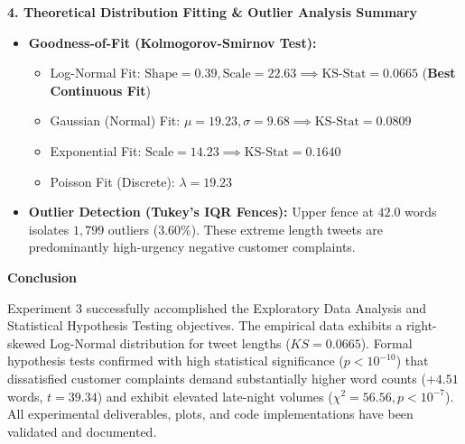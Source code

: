 \documentclass[12pt]{article}
\begin{document}
\vspace{0.6em}

\noindent \textbf{4. Theoretical Distribution Fitting \& Outlier Analysis Summary}
\begin{itemize}[leftmargin=1.5em]
    \item \textbf{Goodness-of-Fit (Kolmogorov-Smirnov Test):}
    \begin{itemize}
        \item Log-Normal Fit: $\text{Shape} = 0.39, \text{Scale} = 22.63 \implies \text{KS-Stat} = 0.0665$ (\textbf{Best Continuous Fit})
        \item Gaussian (Normal) Fit: $\mu = 19.23, \sigma = 9.68 \implies \text{KS-Stat} = 0.0809$
        \item Exponential Fit: $\text{Scale} = 14.23 \implies \text{KS-Stat} = 0.1640$
        \item Poisson Fit (Discrete): $\lambda = 19.23$
    \end{itemize}
    \item \textbf{Outlier Detection (Tukey's IQR Fences):} Upper fence at $42.0$ words isolates $1,799$ outliers ($3.60\%$). These extreme length tweets are predominantly high-urgency negative customer complaints.
\end{itemize}

\vspace{0.8em}

\noindent \textbf{Conclusion}

\noindent Experiment 3 successfully accomplished the Exploratory Data Analysis and Statistical Hypothesis Testing objectives. The empirical data exhibits a right-skewed Log-Normal distribution for tweet lengths ($KS = 0.0665$). Formal hypothesis tests confirmed with high statistical significance ($p < 10^{-10}$) that dissatisfied customer complaints demand substantially higher word counts ($+4.51$ words, $t = 39.34$) and exhibit elevated late-night volumes ($\chi^2 = 56.56, p < 10^{-7}$). All experimental deliverables, plots, and code implementations have been validated and documented.
\end{document}
